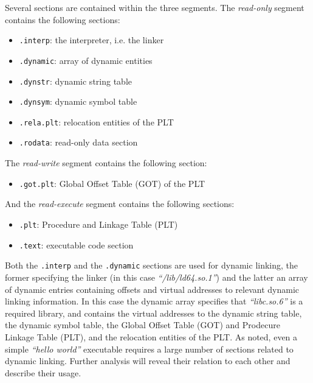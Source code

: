 \documentclass[12pt, a4paper]{article}
\begin{document}
Several sections are contained within the three segments. The \textit{read-only} segment contains the following sections:

\begin{itemize}
	\item \texttt{.interp}: the interpreter, i.e. the linker
	\item \texttt{.dynamic}: array of dynamic entities
	\item \texttt{.dynstr}: dynamic string table
	\item \texttt{.dynsym}: dynamic symbol table
	\item \texttt{.rela.plt}: relocation entities of the PLT
	\item \texttt{.rodata}: read-only data section
\end{itemize}

The \textit{read-write} segment contains the following section:

\begin{itemize}
	\item \texttt{.got.plt}: Global Offset Table (GOT) of the PLT
\end{itemize}

And the \textit{read-execute} segment contains the following sections:

\begin{itemize}
	\item \texttt{.plt}: Procedure and Linkage Table (PLT)
	\item \texttt{.text}: executable code section
\end{itemize}


Both the \texttt{.interp} and the \texttt{.dynamic} sections are used for dynamic linking, the former specifying the linker (in this case \textit{``/lib/ld64.so.1''}) and the latter an array of dynamic entries containing offsets and virtual addresses to relevant dynamic linking information. In this case the dynamic array specifies that \textit{``libc.so.6''} is a required library, and contains the virtual addresses to the dynamic string table, the dynamic symbol table, the Global Offset Table (GOT) and Prodecure Linkage Table (PLT), and the relocation entities of the PLT. As noted, even a simple \textit{``hello world''} executable requires a large number of sections related to dynamic linking. Further analysis will reveal their relation to each other and describe their usage.

\end{document}
